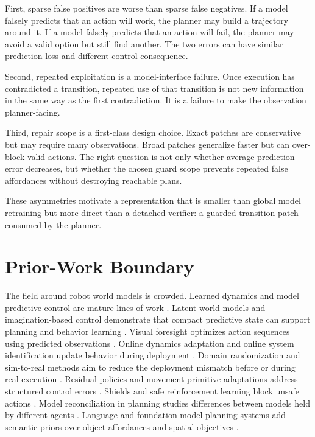 \documentclass{article}
\begin{document}
First, sparse false positives are worse than sparse false negatives. If a model falsely predicts that an action will work, the planner may build a trajectory around it. If a model falsely predicts that an action will fail, the planner may avoid a valid option but still find another. The two errors can have similar prediction loss and different control consequence.

Second, repeated exploitation is a model-interface failure. Once execution has contradicted a transition, repeated use of that transition is not new information in the same way as the first contradiction. It is a failure to make the observation planner-facing.

Third, repair scope is a first-class design choice. Exact patches are conservative but may require many observations. Broad patches generalize faster but can over-block valid actions. The right question is not only whether average prediction error decreases, but whether the chosen guard scope prevents repeated false affordances without destroying reachable plans.

These asymmetries motivate a representation that is smaller than global model retraining but more direct than a detached verifier: a guarded transition patch consumed by the planner.

\section{Prior-Work Boundary}

The field around robot world models is crowded. Learned dynamics and model predictive control are mature lines of work \citep{deisenroth2013gp,lenz2015deepmpc,nagabandi2018neural,chua2018pets}. Latent world models and imagination-based control demonstrate that compact predictive state can support planning and behavior learning \citep{ha2018worldmodels,hafner2019planet,hafner2020dreamer}. Visual foresight optimizes action sequences using predicted observations \citep{ebert2018visual}. Online dynamics adaptation and online system identification update behavior during deployment \citep{fu2016oneshot,yu2017uposi}. Domain randomization and sim-to-real methods aim to reduce the deployment mismatch before or during real execution \citep{tobin2017domain,tan2018sim,jeong2020self}. Residual policies and movement-primitive adaptations address structured control errors \citep{ijspeert2013dmp,chi2022residual}. Shields and safe reinforcement learning block unsafe actions \citep{alshiekh2018shielding}. Model reconciliation in planning studies differences between models held by different agents \citep{chakraborti2017modelreconciliation}. Language and foundation-model planning systems add semantic priors over object affordances and spatial objectives \citep{huang2023voxposer}.
\end{document}
